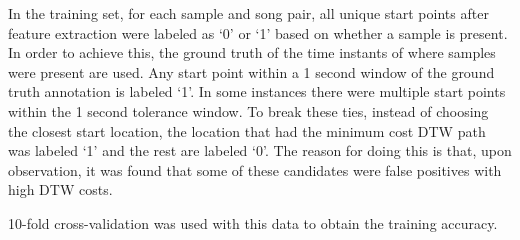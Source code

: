 \documentclass{article}
\begin{document}
In the training set, for each sample and song pair, all unique start points after feature extraction were labeled as `0' or `1' based on whether a sample is present. In order to achieve this, the ground truth of the time instants of where samples were present are used. Any start point within a 1 second window of the ground truth annotation is labeled `1'. In some instances there were multiple start points within the 1 second tolerance window. To break these ties, instead of choosing the closest start location, the location that had the minimum cost DTW path was labeled `1' and the rest are labeled `0'. The reason for doing this is that, upon observation, it was found that some of these candidates were false positives with high DTW costs.

10-fold cross-validation was used with this data to obtain the training accuracy.






\end{document}
